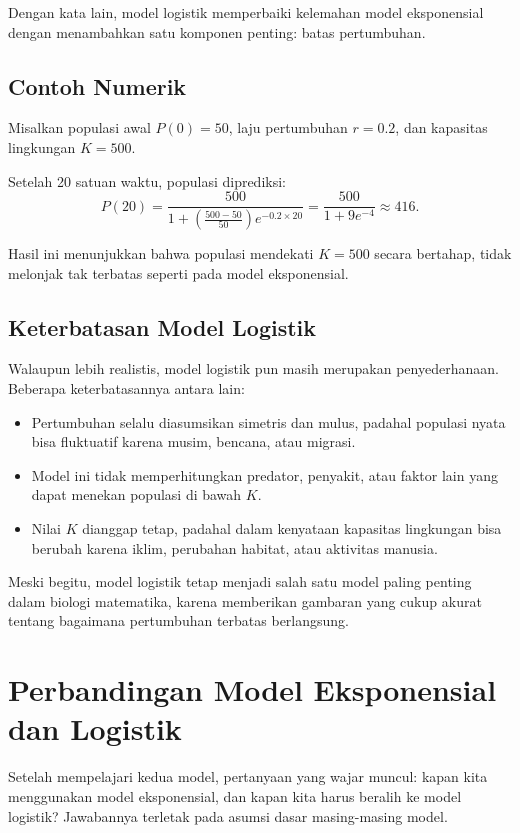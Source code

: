 \documentclass{bukumjh}
\begin{document}
Dengan kata lain, model logistik memperbaiki kelemahan model eksponensial dengan menambahkan satu komponen penting: {\jsg batas pertumbuhan}.

\subsection*{Contoh Numerik}

Misalkan populasi awal $P(0) = 50$, laju pertumbuhan $r = 0.2$, dan kapasitas lingkungan $K = 500$.  

Setelah 20 satuan waktu, populasi diprediksi:
\[
P(20) = \frac{500}{1 + \left(\frac{500-50}{50}\right)e^{-0.2 \times 20}}
= \frac{500}{1 + 9 e^{-4}}
\approx 416.
\]

Hasil ini menunjukkan bahwa populasi mendekati $K = 500$ secara bertahap, tidak melonjak tak terbatas seperti pada model eksponensial.

\subsection*{Keterbatasan Model Logistik}

Walaupun lebih realistis, model logistik pun masih merupakan penyederhanaan. Beberapa keterbatasannya antara lain:
\begin{itemize}
    \item Pertumbuhan selalu diasumsikan simetris dan mulus, padahal populasi nyata bisa fluktuatif karena musim, bencana, atau migrasi.
    \item Model ini tidak memperhitungkan predator, penyakit, atau faktor lain yang dapat menekan populasi di bawah $K$.
    \item Nilai $K$ dianggap tetap, padahal dalam kenyataan kapasitas lingkungan bisa berubah karena iklim, perubahan habitat, atau aktivitas manusia.
\end{itemize}

Meski begitu, model logistik tetap menjadi salah satu model paling penting dalam biologi matematika, karena memberikan gambaran yang cukup akurat tentang bagaimana pertumbuhan terbatas berlangsung.

\section{Perbandingan Model Eksponensial dan Logistik}

Setelah mempelajari kedua model, pertanyaan yang wajar muncul: kapan kita menggunakan model eksponensial, dan kapan kita harus beralih ke model logistik? Jawabannya terletak pada asumsi dasar masing-masing model.
\end{document}
